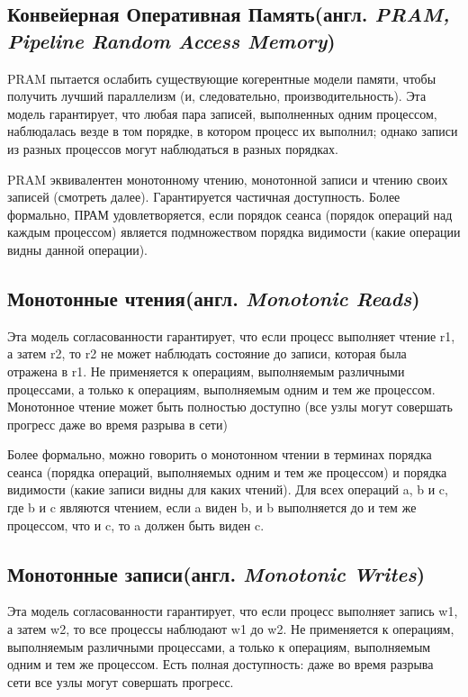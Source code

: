 \documentclass[12pt,  openany]{book}
\begin{document}
\subsection{Конвейерная Оперативная Память(англ.  \textit{PRAM, Pipeline Random Access Memory})}
PRAM пытается ослабить существующие когерентные модели памяти, чтобы получить лучший параллелизм (и, следовательно, производительность). Эта модель гарантирует, что любая пара записей, выполненных одним процессом, наблюдалась везде в том порядке, в котором процесс их выполнил; однако записи из разных процессов могут наблюдаться в разных порядках. 
\par
PRAM эквивалентен монотонному чтению, монотонной записи и чтению своих записей (смотреть далее).
Гарантируется частичная доступность.
Более формально, ПРАМ удовлетворяется, если порядок сеанса (порядок операций над каждым процессом) является подмножеством порядка видимости (какие операции видны данной операции).

\subsection{Монотонные чтения(англ.  \textit{Monotonic Reads})}
Эта модель согласованности гарантирует, что если процесс выполняет чтение r1, а затем r2, то r2 не может наблюдать состояние до записи, которая была отражена в r1.
Не применяется к операциям, выполняемым различными процессами, а только к операциям, выполняемым одним и тем же процессом.
Монотонное чтение может быть полностью доступно (все узлы могут совершать прогресс даже во время разрыва в сети)
\par
Более формально, можно говорить о монотонном чтении в терминах порядка сеанса (порядка операций, выполняемых одним и тем же процессом) и порядка видимости (какие записи видны для каких чтений). Для всех операций a, b и c, где b и c являются чтением, если a виден b, и b выполняется до и тем же процессом, что и c, то a должен быть виден c.

\subsection{Монотонные записи(англ.  \textit{Monotonic Writes})}
Эта модель согласованности гарантирует, что если процесс выполняет запись w1,  а затем w2, то все процессы наблюдают w1 до w2. Не применяется к операциям, выполняемым различными процессами, а только к  операциям, выполняемым одним и тем же процессом.
Есть полная доступность: даже во время разрыва сети все узлы могут совершать прогресс.
\end{document}
